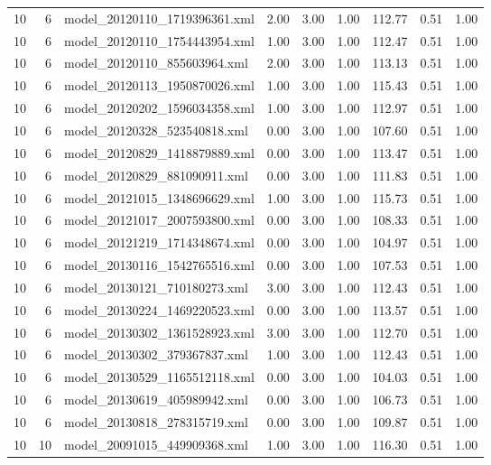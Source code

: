 \begin{table}[ht]
\begin{tabular}{rrlrrrrrr}
   10 &   6 & model\_20120110\_1719396361.xml & 2.00 & 3.00 & 1.00 & 112.77 & 0.51 & 1.00 \\ 
   10 &   6 & model\_20120110\_1754443954.xml & 1.00 & 3.00 & 1.00 & 112.47 & 0.51 & 1.00 \\ 
   10 &   6 & model\_20120110\_855603964.xml & 2.00 & 3.00 & 1.00 & 113.13 & 0.51 & 1.00 \\ 
   10 &   6 & model\_20120113\_1950870026.xml & 1.00 & 3.00 & 1.00 & 115.43 & 0.51 & 1.00 \\ 
   10 &   6 & model\_20120202\_1596034358.xml & 1.00 & 3.00 & 1.00 & 112.97 & 0.51 & 1.00 \\ 
   10 &   6 & model\_20120328\_523540818.xml & 0.00 & 3.00 & 1.00 & 107.60 & 0.51 & 1.00 \\ 
   10 &   6 & model\_20120829\_1418879889.xml & 0.00 & 3.00 & 1.00 & 113.47 & 0.51 & 1.00 \\ 
   10 &   6 & model\_20120829\_881090911.xml & 0.00 & 3.00 & 1.00 & 111.83 & 0.51 & 1.00 \\ 
   10 &   6 & model\_20121015\_1348696629.xml & 1.00 & 3.00 & 1.00 & 115.73 & 0.51 & 1.00 \\ 
   10 &   6 & model\_20121017\_2007593800.xml & 0.00 & 3.00 & 1.00 & 108.33 & 0.51 & 1.00 \\ 
   10 &   6 & model\_20121219\_1714348674.xml & 0.00 & 3.00 & 1.00 & 104.97 & 0.51 & 1.00 \\ 
   10 &   6 & model\_20130116\_1542765516.xml & 0.00 & 3.00 & 1.00 & 107.53 & 0.51 & 1.00 \\ 
   10 &   6 & model\_20130121\_710180273.xml & 3.00 & 3.00 & 1.00 & 112.43 & 0.51 & 1.00 \\ 
   10 &   6 & model\_20130224\_1469220523.xml & 0.00 & 3.00 & 1.00 & 113.57 & 0.51 & 1.00 \\ 
   10 &   6 & model\_20130302\_1361528923.xml & 3.00 & 3.00 & 1.00 & 112.70 & 0.51 & 1.00 \\ 
   10 &   6 & model\_20130302\_379367837.xml & 1.00 & 3.00 & 1.00 & 112.43 & 0.51 & 1.00 \\ 
   10 &   6 & model\_20130529\_1165512118.xml & 0.00 & 3.00 & 1.00 & 104.03 & 0.51 & 1.00 \\ 
   10 &   6 & model\_20130619\_405989942.xml & 0.00 & 3.00 & 1.00 & 106.73 & 0.51 & 1.00 \\ 
   10 &   6 & model\_20130818\_278315719.xml & 0.00 & 3.00 & 1.00 & 109.87 & 0.51 & 1.00 \\ 
   10 &  10 & model\_20091015\_449909368.xml & 1.00 & 3.00 & 1.00 & 116.30 & 0.51 & 1.00 \\ 

\end{tabular}
\end{table}
